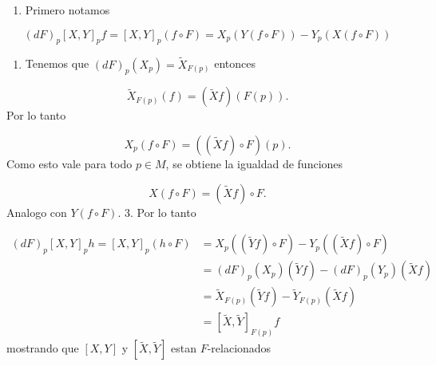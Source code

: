 \begin{bookproof}{}
\begin{enumerate}
\item Primero notamos
\end{enumerate}
\[
(dF)_{p}[X,Y]_{p}f=[X,Y]_{p}(f\circ F)=X_{p}(Y(f\circ F))-Y_{p}(X(f\circ F))
\]
\begin{enumerate}[start=2]
\item Tenemos que $(dF)_{p}(X_{p})=\widetilde{X}_{F(p)}$ entonces
\end{enumerate}
\[
\widetilde X_{F(p)}(f)=(\widetilde Xf)(F(p)).
\]
Por lo tanto

\[
X_p(f\circ F)=((\widetilde Xf)\circ F)(p).
\]
Como esto vale para todo $p\in M$, se obtiene la igualdad de funciones

\[
X(f\circ F)=(\widetilde Xf)\circ F.
\]
Analogo con $Y(f\circ F)$. 3. Por lo tanto

\[
\begin{aligned}(dF)_{p}[X,Y]_{p}h=[X,Y]_{p}(h\circ F)&=X_{p}((\widetilde Y f)\circ F)-Y_{p}((\widetilde X f)\circ F)\\&=(dF)_{p}(X_{p})(\widetilde{Y}f)-(dF)_{p}(Y_{p})(\widetilde{X}f)\\&=\widetilde{X}_{F(p)}(\widetilde{Y}f)-\widetilde{Y}_{F(p)}(\widetilde{X}f)\\&=[\widetilde{X},\widetilde{Y}]_{F(p)}f\end{aligned}
\]
mostrando que $[X,Y]$ y $[\widetilde{X},\widetilde{Y}]$ estan $F$-relacionados

\bookqed
\end{bookproof}
